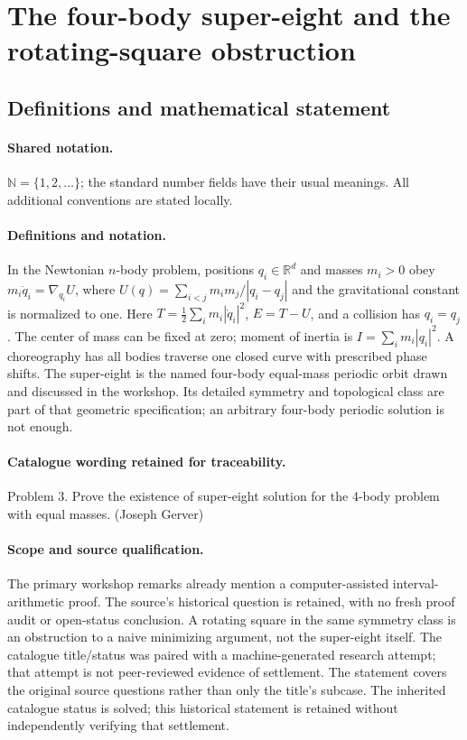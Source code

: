 \documentclass[11pt]{article}
\begin{document}
\section{The four-body super-eight and the rotating-square obstruction}\label{statement}

\subsection{Definitions and mathematical statement}

\paragraph{Shared notation.}$\mathbb N=\{1,2,\ldots\}$; the standard number fields have their usual meanings. All additional conventions are stated locally.


\paragraph{Definitions and notation.}In the Newtonian $n$-body problem, positions $q_i\in\mathbb R^d$ and masses $m_i>0$ obey $m_i\ddot q_i=\nabla_{q_i}U$, where $U(q)=\sum_{i<j}m_im_j/|q_i-q_j|$ and the gravitational constant is normalized to one. Here $T=\tfrac12\sum_i m_i|\dot q_i|^2$, $E=T-U$, and a collision has $q_i=q_j$. The center of mass can be fixed at zero; moment of inertia is $I=\sum_i m_i|q_i|^2$. A choreography has all bodies traverse one closed curve with prescribed phase shifts. The super-eight is the named four-body equal-mass periodic orbit drawn and discussed in the workshop. Its detailed symmetry and topological class are part of that geometric specification; an arbitrary four-body periodic solution is not enough.

\paragraph{Catalogue wording retained for traceability.}
Problem 3. Prove the existence of super-eight solution for the 4-body problem with equal masses. (Joseph Gerver)
\paragraph{Scope and source qualification.}The primary workshop remarks already mention a computer-assisted interval-arithmetic proof. The source’s historical question is retained, with no fresh proof audit or open-status conclusion. A rotating square in the same symmetry class is an obstruction to a naive minimizing argument, not the super-eight itself. The catalogue title/status was paired with a machine-generated research attempt; that attempt is not peer-reviewed evidence of settlement. The statement covers the original source questions rather than only the title’s subcase. The inherited catalogue status is solved; this historical statement is retained without independently verifying that settlement.
\end{document}
